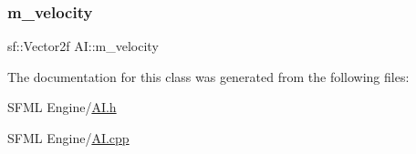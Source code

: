 \mbox{\label{class_a_i_a0cdbc2caf054dd4dce2d51357ee98d17}} 
\subsubsection{\texorpdfstring{m\+\_\+velocity}{m\_velocity}}
{\footnotesize\ttfamily sf\+::\+Vector2f A\+I\+::m\+\_\+velocity\hspace{0.3cm}{\ttfamily [protected]}}



The documentation for this class was generated from the following files\+:\begin{DoxyCompactItemize}
\item 
S\+F\+M\+L Engine/\hyperlink{_a_i_8h}{A\+I.\+h}\item 
S\+F\+M\+L Engine/\hyperlink{_a_i_8cpp}{A\+I.\+cpp}\end{DoxyCompactItemize}
